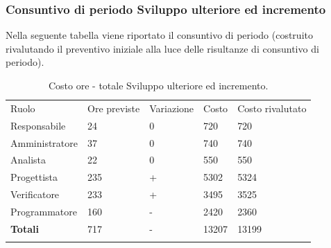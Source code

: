 \documentclass[a4paper]{article}
\begin{document}
					\subsubsection{Consuntivo di periodo Sviluppo ulteriore ed incremento}
					Nella seguente tabella viene riportato il consuntivo di periodo (costruito rivalutando il preventivo iniziale alla luce delle risultanze 
					di consuntivo di periodo).
					\begin{table}[H]
						\begin{tabularx}{\textwidth}{Y Y Y Y Y}
							Ruolo & Ore previste & Variazione & Costo & Costo rivalutato\\
							Responsabile 	& 24  & 0 & 720  & 720 \\
							Amministratore 	& 37  & 0 & 740  & 740 \\
							Analista 		& 22  & 0 & 550  & 550\\
							Progettista 	& 235 & + & 5302 & 5324\\
							Verificatore 	& 233 & + & 3495 & 3525\\
							Programmatore 	& 160 & - & 2420 & 2360\\
							\textbf{Totali} & 717 & - & 13207 & 13199\\
						\end{tabularx}
					\caption{Costo ore - totale Sviluppo ulteriore ed incremento.}
					\label{TCRendicontati}
					\end{table}
\end{document}
